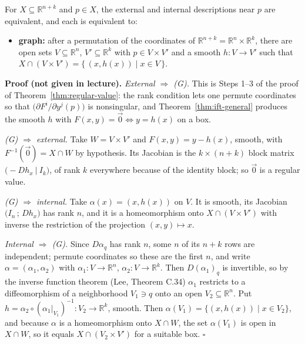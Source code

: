 \documentclass[11pt]{report}
\makeatletter
\newcounter{thmcounter}[section]
\renewenvironment{proof}[1][Proof]{\noindent\textbf{#1.} }{\hfill$\square$\par\vspace{5pt}}
\newcommand{\thmlabel}[1]{\edef\@currentlabel{\arabic{section}.\arabic{thmcounter}}\label{#1}}
\makeatother
\begin{document}
\begin{thmbox}\thmlabel{thm:ext-int}
For $X \subseteq \mathbb{R}^{n+k}$ and $p \in X$, the external and internal descriptions near $p$ are equivalent, and each is equivalent to:
\begin{itemize}
    \item[(G)] \textbf{graph:} after a permutation of the coordinates of $\mathbb{R}^{n+k} = \mathbb{R}^n \times \mathbb{R}^k$, there are open sets $V \subseteq \mathbb{R}^n$, $V' \subseteq \mathbb{R}^k$ with $p \in V \times V'$ and a smooth $h : V \to V'$ such that $X \cap (V \times V') = \{\, (x, h(x)) \mid x \in V \,\}$.
\end{itemize}
\end{thmbox}

\begin{proof}[Proof (not given in lecture)]
\emph{External $\Rightarrow$ (G).} This is Steps 1--3 of the proof of Theorem~\ref{thm:regular-value}: the rank condition lets one permute coordinates so that $\big(\partial F^i/\partial y^j(p)\big)$ is nonsingular, and Theorem~\ref{thm:ift-general} produces the smooth $h$ with $F(x,y) = \vec 0 \iff y = h(x)$ on a box.

\emph{(G) $\Rightarrow$ external.} Take $W = V \times V'$ and $F(x,y) = y - h(x)$, smooth, with $F^{-1}(\vec 0) = X \cap W$ by hypothesis. Its Jacobian is the $k \times (n+k)$ block matrix $\big(-Dh_x \ \big| \ I_k\big)$, of rank $k$ everywhere because of the identity block; so $\vec 0$ is a regular value.

\emph{(G) $\Rightarrow$ internal.} Take $\alpha(x) = (x, h(x))$ on $V$. It is smooth, its Jacobian $\big(I_n \, ; \, Dh_x\big)$ has rank $n$, and it is a homeomorphism onto $X \cap (V \times V')$ with inverse the restriction of the projection $(x,y) \mapsto x$.

\emph{Internal $\Rightarrow$ (G).} Since $D\alpha_q$ has rank $n$, some $n$ of its $n+k$ rows are independent; permute coordinates so these are the first $n$, and write $\alpha = (\alpha_1, \alpha_2)$ with $\alpha_1 : V \to \mathbb{R}^n$, $\alpha_2 : V \to \mathbb{R}^k$. Then $D(\alpha_1)_q$ is invertible, so by the inverse function theorem (Lee, Theorem C.34) $\alpha_1$ restricts to a diffeomorphism of a neighborhood $V_1 \ni q$ onto an open $V_2 \subseteq \mathbb{R}^n$. Put $h = \alpha_2 \circ (\alpha_1|_{V_1})^{-1} : V_2 \to \mathbb{R}^k$, smooth. Then $\alpha(V_1) = \{(x, h(x)) \mid x \in V_2\}$, and because $\alpha$ is a homeomorphism onto $X \cap W$, the set $\alpha(V_1)$ is open in $X \cap W$, so it equals $X \cap (V_2 \times V')$ for a suitable box.
\end{proof}
\end{document}
